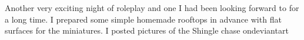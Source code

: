 Another very exciting night of roleplay and one I had been looking forward to for a long time. I prepared some simple homemade rooftops in advance with flat surfaces for the miniatures. I posted pictures of the Shingle chase ondeviantart 